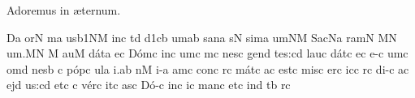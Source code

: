 
\beginhymn Adoremus in \ae ternum.

\nosolesmescustos
\initiumgregorianum
{}%
\sgn {}{}D\punctum a\egn
\sgn {}or\punctum N\egn
{}m\punctum a\egn
\sgn {}us\episem b1\clivis NM\egn
\spatium
\sgn {}in\punctum c\egn
\spatium
\sgn {}{\ae}t\punctum d\egn
{}\episem d1\clivis cb\egn
\sgn {}um\punctum a\augmentum b\egn
\spatium
\divisiominima
\spatium
\sgn san\punctum a\egn
{}s\punctum N\egn
\sgn sim\punctum a\egn
\sgn {}um\clivis NM\egn
\spatium
\sgn Sac\pes Na\egn
\sgn ram\punctum N\egn
{}\punctum M\augmentum N\egn
\sgn {}u{m.}\punctum M\augmentum N\egn
\spatium
\divisiofinalis
\spatium
\custos M
\lineaproxima
{}au\punctum M\egn
\sgn d{\'a}t\punctum a\egn
\sgn {}e{}\punctum c\egn
\spatium
\sgn D{\'o}m\punctum c\egn
\sgn {}in\punctum c\egn
\sgn {}um\punctum c\egn
\spatium
{}m\punctum c\egn
\sgn nes\punctum c\egn
\spatium
\sgn gen\punctum d\egn
\sgn te{s:}\punctum c\augmentum d\egn
\spatium
\asteriscus
\divisiomaior
\spatium
\sgn lau\punctum c\egn
\sgn d{\'a}t\punctum c\egn
\sgn {}e{}\punctum c\egn
\spatium
\sgn {}e-\punctum c\egn
\sgn {}um\punctum c\egn
\spatium
\sgn {}om\punctum d\egn
\sgn nes\punctum b\egn
\spatium
\custos c
\lineaproxima
\sgn p{\'o}p\punctum c\egn
\sgn {}ul\punctum a\egn
\sgn {}i.\punctum a\augmentum b\egn
\spatium
\divisiofinalis
\spatium
{}n\punctum M\egn
\sgn {}i-\punctum a\egn
\sgn {}am\punctum c\egn
\spatium
\sgn c{o}n\punctum c\egn
{}r\punctum c\egn
\sgn m{\'a}t\punctum c\egn
\sgn {}a{}\punctum c\egn
\spatium
\sgn {}e{st}\punctum c\egn
\spatium
\sgn mis\punctum c\egn
\sgn {}er\punctum c\egn
\sgn {}ic\punctum c\egn
{}r\punctum c\egn
\sgn di-\punctum c\egn
\sgn {}a{}\punctum c\egn
\spatium
\sgn {}ej\punctum d\egn
\sgn {}u{s:}\punctum c\augmentum d\egn
\spatium
\asteriscus
\divisiomaior
\spatium
\sgn {}et\punctum c\egn
\spatium
\custos c
\lineaproxima
\sgn v{\'e}r\punctum c\egn
\sgn {}it\punctum c\egn
\sgn {}as\punctum c\egn
\spatium
\sgn D{\'o}-\punctum c\egn
{}in\punctum c\egn
\sgn {}i{}\punctum c\egn
\spatium
\sgn man\punctum c\egn
\sgn {}et\punctum c\egn
\spatium
\sgn {}in\punctum d\egn
\spatium
\sgn {}{\ae}t\punctum b\egn
{}r\punctum c\egn
